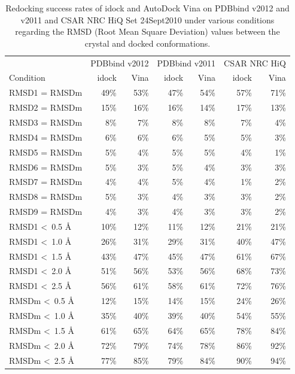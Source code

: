 \documentclass[12pt]{article}
\begin{document}
\begin{table}
\centering
\begin{tabular}{lrrrrrr}
\hline
& \multicolumn{2}{c}{PDBbind v2012} & \multicolumn{2}{c}{PDBbind v2011} & \multicolumn{2}{c}{CSAR NRC HiQ}\\
Condition & idock & Vina & idock & Vina & idock & Vina\\
\hline
RMSD1 = RMSDm & 49\% & 53\% & 47\% & 54\% & 57\% & 71\%\\
RMSD2 = RMSDm & 15\% & 16\% & 16\% & 14\% & 17\% & 13\%\\
RMSD3 = RMSDm &  8\% &  7\% &  8\% &  8\% &  7\% &  4\%\\
RMSD4 = RMSDm &  6\% &  6\% &  6\% &  5\% &  5\% &  3\%\\
RMSD5 = RMSDm &  5\% &  4\% &  5\% &  5\% &  4\% &  1\%\\
RMSD6 = RMSDm &  5\% &  3\% &  5\% &  4\% &  3\% &  3\%\\
RMSD7 = RMSDm &  4\% &  4\% &  5\% &  4\% &  1\% &  2\%\\
RMSD8 = RMSDm &  5\% &  3\% &  4\% &  3\% &  3\% &  2\%\\
RMSD9 = RMSDm &  4\% &  3\% &  4\% &  3\% &  3\% &  2\%\\
\noalign{\smallskip}
RMSD1 \textless\ 0.5 \AA & 10\% & 12\% & 11\% & 12\% & 21\% & 21\%\\
RMSD1 \textless\ 1.0 \AA & 26\% & 31\% & 29\% & 31\% & 40\% & 47\%\\
RMSD1 \textless\ 1.5 \AA & 43\% & 47\% & 45\% & 47\% & 61\% & 67\%\\
RMSD1 \textless\ 2.0 \AA & 51\% & 56\% & 53\% & 56\% & 68\% & 73\%\\
RMSD1 \textless\ 2.5 \AA & 56\% & 61\% & 58\% & 61\% & 72\% & 76\%\\
\noalign{\smallskip}
RMSDm \textless\ 0.5 \AA & 12\% & 15\% & 14\% & 15\% & 24\% & 26\%\\
RMSDm \textless\ 1.0 \AA & 35\% & 40\% & 39\% & 40\% & 54\% & 55\%\\
RMSDm \textless\ 1.5 \AA & 61\% & 65\% & 64\% & 65\% & 78\% & 84\%\\
RMSDm \textless\ 2.0 \AA & 72\% & 79\% & 74\% & 78\% & 86\% & 92\%\\
RMSDm \textless\ 2.5 \AA & 77\% & 85\% & 79\% & 84\% & 90\% & 94\%\\
\hline
\end{tabular}
\caption{\label{SuccessRate} Redocking success rates of idock and AutoDock Vina on PDBbind v2012 and v2011 and CSAR NRC HiQ Set 24Sept2010 under various conditions regarding the RMSD (Root Mean Square Deviation) values between the crystal and docked conformations.}
\end{table}
\end{document}

